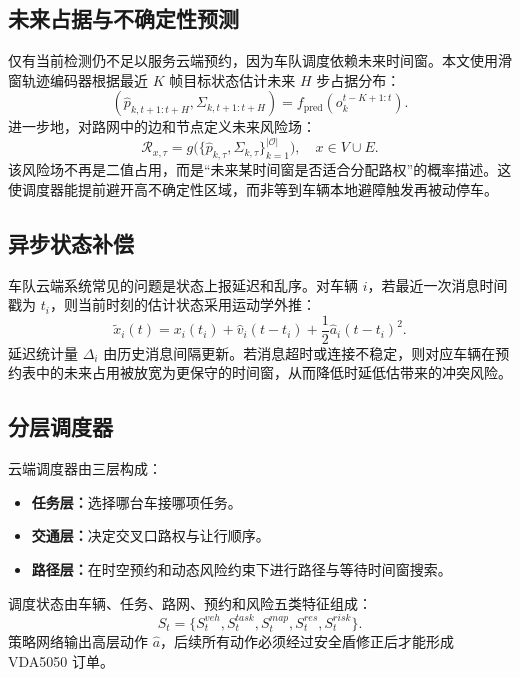 \documentclass[UTF8,twocolumn,10pt]{ctexart}
\begin{document}
\subsection{未来占据与不确定性预测}

仅有当前检测仍不足以服务云端预约，因为车队调度依赖未来时间窗。本文使用滑窗轨迹编码器根据最近 $K$ 帧目标状态估计未来 $H$ 步占据分布：
\begin{equation}
(\hat{p}_{k,t+1:t+H}, \Sigma_{k,t+1:t+H})
= f_{\mathrm{pred}}(o_k^{t-K+1:t}).
\end{equation}
进一步地，对路网中的边和节点定义未来风险场：
\begin{equation}
\mathcal{R}_{x,\tau} = g\big(\{\hat{p}_{k,\tau}, \Sigma_{k,\tau}\}_{k=1}^{|\mathcal{O}|}\big), \quad x\in V\cup E.
\end{equation}
该风险场不再是二值占用，而是“未来某时间窗是否适合分配路权”的概率描述。这使调度器能提前避开高不确定性区域，而非等到车辆本地避障触发再被动停车。

\subsection{异步状态补偿}

车队云端系统常见的问题是状态上报延迟和乱序。对车辆 $i$，若最近一次消息时间戳为 $t_i$，则当前时刻的估计状态采用运动学外推：
\begin{equation}
\tilde{x}_i(t) = x_i(t_i) + \hat{v}_i (t-t_i) + \frac{1}{2}\hat{a}_i (t-t_i)^2.
\end{equation}
延迟统计量 $\Delta_i$ 由历史消息间隔更新。若消息超时或连接不稳定，则对应车辆在预约表中的未来占用被放宽为更保守的时间窗，从而降低时延低估带来的冲突风险。

\subsection{分层调度器}

云端调度器由三层构成：
\begin{itemize}
  \item \textbf{任务层：}选择哪台车接哪项任务。
  \item \textbf{交通层：}决定交叉口路权与让行顺序。
  \item \textbf{路径层：}在时空预约和动态风险约束下进行路径与等待时间窗搜索。
\end{itemize}

调度状态由车辆、任务、路网、预约和风险五类特征组成：
\begin{equation}
S_t = \{S_t^{veh}, S_t^{task}, S_t^{map}, S_t^{res}, S_t^{risk}\}.
\end{equation}
策略网络输出高层动作 $\hat{a}$，后续所有动作必须经过安全盾修正后才能形成 VDA5050 订单。
\end{document}
